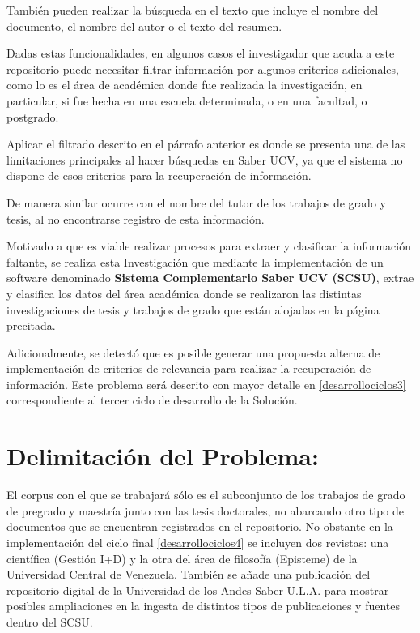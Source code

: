 \documentclass[
  10,
  openany]{book}
\begin{document}
También pueden realizar la búsqueda en el texto que incluye el nombre del documento, el nombre del autor o el texto del resumen.

Dadas estas funcionalidades, en algunos casos el investigador que acuda a este repositorio puede necesitar filtrar información por algunos criterios adicionales, como lo es el área de académica donde fue realizada la investigación, en particular, si fue hecha en una escuela determinada, o en una facultad, o postgrado.

Aplicar el filtrado descrito en el párrafo anterior es donde se presenta una de las limitaciones principales al hacer búsquedas en Saber UCV, ya que el sistema no dispone de esos criterios para la recuperación de información.

De manera similar ocurre con el nombre del tutor de los trabajos de grado y tesis, al no encontrarse registro de esta información.

Motivado a que es viable realizar procesos para extraer y clasificar la información faltante, se realiza esta Investigación que mediante la implementación de un software denominado \textbf{Sistema Complementario Saber UCV (SCSU)}, extrae y clasifica los datos del área académica donde se realizaron las distintas investigaciones de tesis y trabajos de grado que están alojadas en la página precitada.

Adicionalmente, se detectó que es posible generar una propuesta alterna de implementación de criterios de relevancia para realizar la recuperación de información. Este problema será descrito con mayor detalle en \ref{desarrollociclos3} correspondiente al tercer ciclo de desarrollo de la Solución.

\hypertarget{delimitacion}{%
\section{Delimitación del Problema:}\label{delimitacion}}

El corpus con el que se trabajará sólo es el subconjunto de los trabajos de grado de pregrado y maestría junto con las tesis doctorales, no abarcando otro tipo de documentos que se encuentran registrados en el repositorio. No obstante en la implementación del ciclo final \ref{desarrollociclos4} se incluyen dos revistas: una científica (Gestión I+D) y la otra del área de filosofía (Episteme) de la Universidad Central de Venezuela. También se añade una publicación del repositorio digital de la Universidad de los Andes Saber U.L.A. para mostrar posibles ampliaciones en la ingesta de distintos tipos de publicaciones y fuentes dentro del SCSU.
\end{document}
